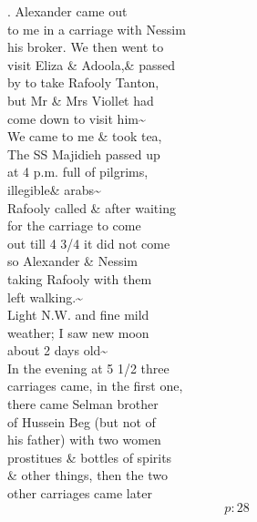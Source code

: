 \documentclass{report}
\begin{document}


	\par{
 	. Alexander came out\ \\to me in a carriage with Nessim\ \\his broker. We then went to\ \\visit Eliza \& Adoola,\& passed\ \\by to take Rafooly Tanton,\ \\but Mr \& Mrs Viollet had\ \\come down to visit him\~{}\ \\We came to me \& took tea,\ \\The SS Majidieh passed up\ \\at 4 p.m. full of pilgrims,\ \\\lbrack illegible\rbrack \& arabs\~{}\ \\Rafooly called \& after waiting\ \\for the carriage to come\ \\out till 4 3/4 it did not come\ \\so Alexander \& Nessim\ \\taking Rafooly with them\ \\left walking.\~{}\ \\Light N.W. and fine mild\ \\weather; I saw new moon\ \\about 2 days old\~{}\ \\In the evening at 5 1/2 three\ \\carriages came, in the first one,\ \\there came Selman brother\ \\of Hussein Beg (but not of\ \\his father) with two women\ \\prostitues \& bottles of spirits\ \\\& other things, then the two\ \\other carriages came later\ \\
  \[p: 28 \]

	}

\end{document}
